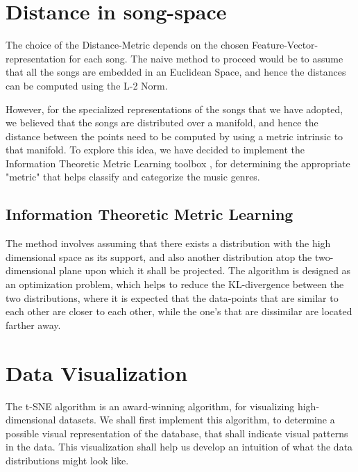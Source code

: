 \documentclass[12pt]{article}
\begin{document}
\section{Distance in song-space}

The choice of the Distance-Metric depends on the chosen Feature-Vector-representation for each song. The naive method to proceed would be to assume that all the songs are embedded in an Euclidean Space, and hence the distances can be computed using the L-2 Norm. 

However, for the specialized representations of the songs that we have adopted, we believed that the songs are distributed over a manifold, and hence the distance between the points need to be computed by using a metric intrinsic to that manifold. To explore this idea, we have decided to implement the Information Theoretic Metric Learning toolbox \cite{infoTheoryMetricLearning}, for determining the appropriate "metric" that helps classify and categorize the music genres. 

\subsection{Information Theoretic Metric Learning}

The method involves assuming that there exists a distribution with the high dimensional space as its support, and also another distribution atop the two-dimensional plane upon which it shall be projected. The algorithm is designed as an optimization problem, which helps to reduce the KL-divergence between the two distributions, where it is expected that the data-points that are similar to each other are closer to each other, while the one's that are dissimilar are located farther away. 

\section{Data Visualization}
The t-SNE algorithm \cite{tSNEdataViz} is an award-winning algorithm, for visualizing high-dimensional datasets. We shall first implement this algorithm, to determine a possible visual representation of the database, that shall indicate visual patterns in the data. This visualization shall help us develop an intuition of what the data distributions might look like. 
\end{document}
